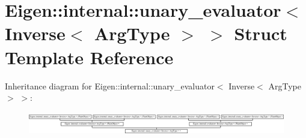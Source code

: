 \hypertarget{struct_eigen_1_1internal_1_1unary__evaluator_3_01_inverse_3_01_arg_type_01_4_01_4}{}\section{Eigen\+:\+:internal\+:\+:unary\+\_\+evaluator$<$ Inverse$<$ Arg\+Type $>$ $>$ Struct Template Reference}
\label{struct_eigen_1_1internal_1_1unary__evaluator_3_01_inverse_3_01_arg_type_01_4_01_4}
Inheritance diagram for Eigen\+:\+:internal\+:\+:unary\+\_\+evaluator$<$ Inverse$<$ Arg\+Type $>$ $>$\+:\begin{figure}[H]
\begin{center}
\leavevmode
\includegraphics[height=1.026895cm]{struct_eigen_1_1internal_1_1unary__evaluator_3_01_inverse_3_01_arg_type_01_4_01_4}
\end{center}
\end{figure}

